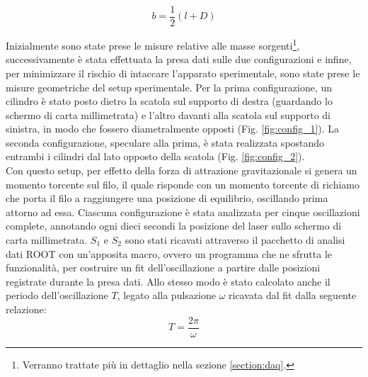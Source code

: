 \documentclass{article}
\begin{document}
\begin{equation}\label{eq:b}
    b = \frac{1}{2} \left( l + D\right)
\end{equation}

Inizialmente sono state prese le misure relative alle masse sorgenti\footnote{Verranno trattate più in dettaglio nella sezione \ref{section:daq}.}, successivamente è stata effettuata la presa dati sulle due configurazioni e infine, per minimizzare il rischio di intaccare l'apparato sperimentale, sono state prese le misure geometriche del setup sperimentale. Per la prima configurazione, un cilindro è stato posto dietro la scatola sul supporto di destra (guardando lo schermo di carta millimetrata) e l'altro davanti alla scatola sul supporto di sinistra, in modo che fossero diametralmente opposti (Fig. \ref{fig:config_1}). La seconda configurazione, speculare alla prima, è stata realizzata spostando entrambi i cilindri dal lato opposto della scatola (Fig. \ref{fig:config_2}).\\
Con questo setup, per effetto della forza di attrazione gravitazionale si genera un momento torcente sul filo, il quale risponde con un momento torcente di richiamo che porta il filo a raggiungere una posizione di equilibrio, oscillando prima attorno ad essa. Ciascuna configurazione è stata analizzata per cinque oscillazioni complete, annotando ogni dieci secondi la posizione del laser sullo schermo di carta millimetrata.
$S_1$ e $S_2$ sono stati ricavati attraverso il pacchetto di analisi dati ROOT con un'apposita macro, ovvero un programma che ne sfrutta le funzionalità, per costruire un fit dell'oscillazione a partire dalle posizioni registrate durante la presa dati. Allo stesso modo è stato calcolato anche il periodo dell'oscillazione $T$, legato alla pulsazione $\omega$ ricavata dal fit dalla seguente relazione:
\begin{equation}\label{eq:periodo}
    T = \frac{2 \pi}{\omega}
\end{equation}
\end{document}
